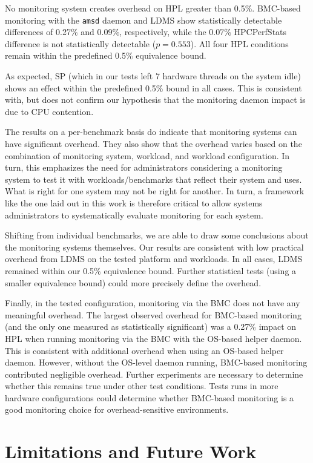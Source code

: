 \documentclass[conference]{IEEEtran}
\begin{document}
No monitoring system creates overhead on HPL greater than 0.5\%.
BMC-based monitoring with the \texttt{amsd} daemon and LDMS show statistically detectable
differences of 0.27\% and 0.09\%, respectively, while the 0.07\% HPCPerfStats difference
is not statistically detectable ($p=0.553$). All four HPL conditions remain within the
predefined 0.5\% equivalence bound.

As expected, SP (which in our tests left 7 hardware threads on the system idle) shows an effect
within the predefined 0.5\% bound in all cases. This is consistent with, 
but does not confirm our hypothesis
that the monitoring daemon impact is due to CPU contention.

The results on a per-benchmark basis do indicate that monitoring systems can 
have significant overhead. They also show that the overhead varies
based on the combination of monitoring system, workload, and workload 
configuration. In turn, this emphasizes the need for administrators considering 
a monitoring system to test it with workloads/benchmarks that reflect their 
system and uses. What is right for one system may not be right for another. 
In turn, a framework like the one laid out in this work is therefore critical 
to allow systems administrators to systematically evaluate monitoring for each 
system.

Shifting from individual benchmarks, we are able to draw some conclusions about 
the monitoring systems themselves. Our results are consistent with low practical overhead from LDMS on the tested platform and workloads. In all cases, LDMS remained within our 0.5\% equivalence bound.
Further statistical 
tests (using a smaller equivalence bound) could more precisely define the overhead.

Finally, in the tested configuration, monitoring via the BMC 
does not have any meaningful overhead. The largest observed 
overhead for BMC-based monitoring (and the only one measured as 
statistically significant) was a 0.27\% impact on HPL when 
running monitoring via the BMC with the OS-based helper daemon. This is
consistent with additional overhead when using an OS-based helper daemon.
However, without the OS-level daemon running, BMC-based 
monitoring contributed negligible overhead. Further experiments are 
necessary to determine whether this remains true under other test conditions.
Tests runs in more hardware configurations could determine whether 
BMC-based monitoring is a good monitoring choice for 
overhead-sensitive environments.

\section{Limitations and Future Work} \label{futurework}
\end{document}
